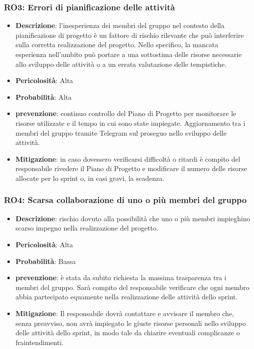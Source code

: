 \documentclass[a4paper, 12pt]{article}
\begin{document}
\subsubsection{RO3: Errori di pianificazione delle attività}
\begin{itemize}
    \item \textbf{Descrizione}: l'inesperienza dei membri del gruppo nel contesto della pianificazione di progetto è un fattore di rischio rilevante
    che può interferire sulla corretta realizzazione del progetto. Nello specifico, la mancata esperienza nell'ambito può portare a una sottostima 
    delle risorse necessarie allo sviluppo delle attività o a un errata valutazione delle tempistiche. 
    \item \textbf{Pericolosità}: Alta
    \item \textbf{Probabilità}: Alta
    \item \textbf{prevenzione}: continuo controllo del Piano di Progetto per monitorare le risorse utilizzate e il tempo in cui sono state impiegate.
    Aggiornamento tra i membri del gruppo tramite Telegram sul proseguo nello sviluppo delle attività.
    \item \textbf{Mitigazione}: in caso dovessero verificarsi difficoltà o ritardi è compito del responsabile rivedere il Piano di Progetto e 
    modificare il numero delle risorse allocate per lo sprint o, in casi gravi, la scadenza.
\end{itemize}
\subsubsection{RO4: Scarsa collaborazione di uno o più membri del gruppo}
\begin{itemize}
    \item \textbf{Descrizione}: rischio dovuto alla possibilità che uno o più membri impieghino scarso impegno nella realizzazione del progetto.
    \item \textbf{Pericolosità}: Alta
    \item \textbf{Probabilità}: Bassa
    \item \textbf{prevenzione}: è stata da subito richiesta la massima trasparenza tra i membri del gruppo.
    Sarà compito del responsabile verificare che ogni membro abbia partecipato equamente nella realizzazione delle attività dello sprint.
    \item \textbf{Mitigazione}: Il responsabile dovrà contattare e avvisare il membro che, senza preavviso, non avrà impiegato le giuste risorse personali nello sviluppo delle attività dello sprint,
    in modo tale da chiarire eventuali complicanze o fraintendimenti. 
\end{itemize}
\end{document}
